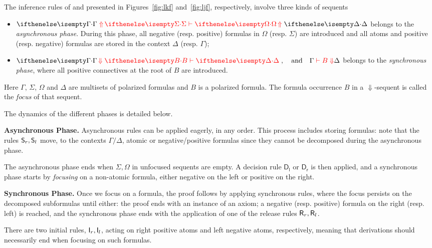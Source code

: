
The inference rules of \LKF and \LJF presented in Figures~\ref{fig:lkf} and~\ref{fig:ljf}, respectively, involve three kinds of sequents 
\begin{itemize}
\item $\jUnf{\Gamma}{\Sigma}{\Omega}{\Delta}$ belongs to the {\em asynchronous phase}. During this phase, all negative (resp. positive) formulas in  $\Omega$ (resp. $\Sigma$) are introduced and all atoms and positive (resp. negative) formulas  are stored in the context $\Delta$ (resp. $\Gamma$);
\item $\jLf{\Gamma}{B}{\Delta},\quad\hbox{and}\quad
  \jRf{\Gamma}{B}{\Delta}$ belongs to the {\em synchronous phase}, where all positive connectives at the root of $B$ are introduced. 
\end{itemize}
Here $\Gamma$, $\Sigma$, $\Omega$ and $\Delta$ are
multisets of polarized formulas and $B$ is a polarized formula.
%
The formula occurrence $B$ in a $\Downarrow$-sequent is called the
\emph{focus} of that sequent.

The dynamics of the different phases is detailed below.

\noindent
{\bf Asynchronous Phase.} Asynchronous rules can be applied eagerly, in any order.
This process includes storing formulas: note that the rules $\mathsf{S}_r, \mathsf{S}_l$ move, to the 
contexts $\Gamma/\Delta$, atomic or negative/positive formulas since they cannot be decomposed during the asynchronous phase.

The asynchronous phase ends when $\Sigma,\Omega$ in unfocused sequents are empty. A decision rule $\mathsf{D_l}$ or  $\mathsf{D_r}$ is then applied,  and
a synchronous phase starts by {\em focusing} on a non-atomic formula, either negative on the left or positive on the right.

\noindent
{\bf Synchronous Phase.} Once we focus on a formula, the proof  follows by applying synchronous rules, where  the focus persists on the decomposed subformulas until either: the proof ends with an instance of an axiom;
a negative (resp. positive) formula  on the right (resp. left) is reached, and the synchronous phase  ends with the application of one of the release rules $\mathsf{R}_r,\mathsf{R}_l$.


There are two initial rules, $\mathsf{I}_r,\mathsf{I}_l$, acting on right positive atoms and left negative atoms, respectively, meaning that derivations should necessarily end when focusing on such formulas.


